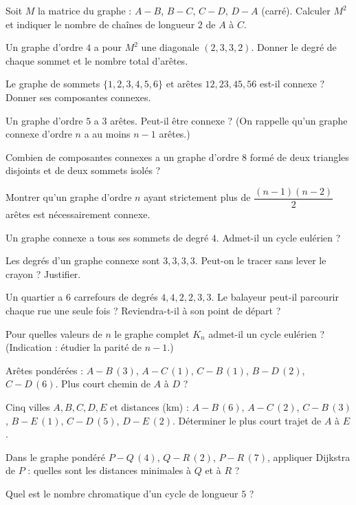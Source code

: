 \exo{} Soit $M$ la matrice du graphe : $A\!-\!B$, $B\!-\!C$, $C\!-\!D$, $D\!-\!A$
(carré). Calculer $M^2$ et indiquer le nombre de chaînes de longueur $2$ de $A$ à $C$.

\exo{} Un graphe d'ordre $4$ a pour $M^2$ une diagonale $(2,3,3,2)$. Donner le degré
de chaque sommet et le nombre total d'arêtes.

\exo{} Le graphe de sommets $\{1,2,3,4,5,6\}$ et arêtes $12,23,45,56$ est-il connexe ?
Donner ses composantes connexes.

\exo{} Un graphe d'ordre $5$ a $3$ arêtes. Peut-il être connexe ? (On rappelle qu'un
graphe connexe d'ordre $n$ a au moins $n-1$ arêtes.)

\exo{} Combien de composantes connexes a un graphe d'ordre $8$ formé de deux triangles
disjoints et de deux sommets isolés ?

\exo{} Montrer qu'un graphe d'ordre $n$ ayant strictement plus de $\dfrac{(n-1)(n-2)}2$
arêtes est nécessairement connexe.

\exo{} Un graphe connexe a tous ses sommets de degré $4$. Admet-il un cycle eulérien ?

\exo{} Les degrés d'un graphe connexe sont $3,3,3,3$. Peut-on le tracer sans lever le
crayon ? Justifier.

\exo{} Un quartier a $6$ carrefours de degrés $4,4,2,2,3,3$. Le balayeur peut-il
parcourir chaque rue une seule fois ? Reviendra-t-il à son point de départ ?

\exo{} Pour quelles valeurs de $n$ le graphe complet $K_n$ admet-il un cycle eulérien ?
(Indication : étudier la parité de $n-1$.)

\exo{} Arêtes pondérées : $A\!-\!B\,(3)$, $A\!-\!C\,(1)$, $C\!-\!B\,(1)$,
$B\!-\!D\,(2)$, $C\!-\!D\,(6)$. Plus court chemin de $A$ à $D$ ?

\exo{} Cinq villes $A,B,C,D,E$ et distances (km) : $A\!-\!B\,(6)$, $A\!-\!C\,(2)$,
$C\!-\!B\,(3)$, $B\!-\!E\,(1)$, $C\!-\!D\,(5)$, $D\!-\!E\,(2)$. Déterminer le plus court trajet
de $A$ à $E$.

\exo{} Dans le graphe pondéré $P\!-\!Q\,(4)$, $Q\!-\!R\,(2)$, $P\!-\!R\,(7)$,
appliquer Dijkstra de $P$ : quelles sont les distances minimales à $Q$ et à $R$ ?

\exo{} Quel est le nombre chromatique d'un cycle de longueur $5$ ?

